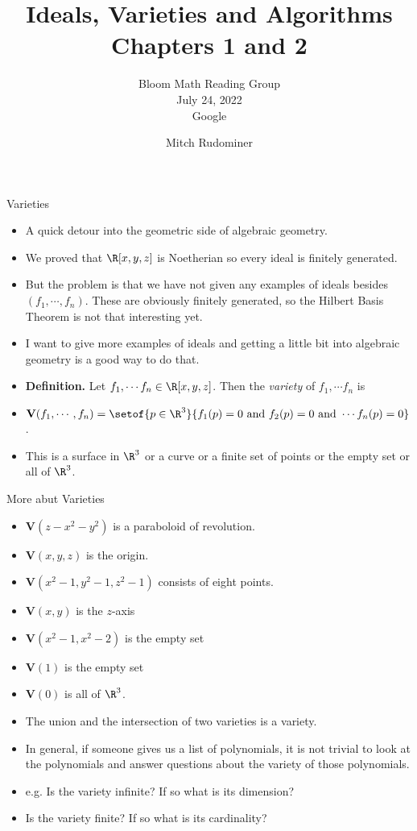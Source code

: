 \documentclass{beamer}
\title{Ideals, Varieties and Algorithms \\ Chapters 1 and 2}
\subtitle{Bloom Math Reading Group \\ July 24, 2022 \\ Google}
\author{Mitch Rudominer}
\date{}
\begin{document}
\begin{frame}
  \titlepage
\end{frame}


\begin{frame}{Varieties}

\begin{itemize}
  \item A quick detour into the geometric side of algebraic geometry.
  \item We proved that $\R[x,y,z]$ is Noetherian so every ideal is finitely generated.
  \item But the problem is that we have not given any examples of ideals besides $(f_1,\cdots, f_n)$. These are obviously finitely generated,
  so the Hilbert Basis Theorem is not that interesting yet.
  \item I want to give more examples of ideals and getting a little bit into algebraic geometry is a good way to do that.
  \item \textbf{Definition.} Let $f_1,\cdots f_n \in \R[x,y,z]$. Then the \emph{variety} of $f_1,\cdots f_n$ is
  \item $\mathbf{V}(f_1,\cdots,f_n) = \setof{p\in\R^3}{f_1(p)=0 \text{ and } f_2(p)=0 \text{ and } \cdots f_n(p)=0}$.
  \item This is a surface in $\R^3$ or a curve or a finite set of points or the empty set or all of $\R^3$.
\end{itemize}
\end{frame}



\begin{frame}{More abut Varieties}

\begin{itemize}
  \item $\mathbf{V}(z-x^2-y^2)$ is a paraboloid of revolution.
  \item $\mathbf{V}(x,y,z)$ is the origin.
  \item $\mathbf{V}(x^2-1,y^2-1,z^2-1)$ consists of eight points.
  \item $\mathbf{V}(x,y)$ is the $z$-axis
  \item $\mathbf{V}(x^2 - 1,x^2 - 2)$ is the empty set
  \item $\mathbf{V}(1)$ is the empty set
  \item $\mathbf{V}(0)$ is all of $\R^3$.
  \item The union and the intersection of two varieties is a variety.
  \item In general, if someone gives us a list of polynomials, it is not trivial to look at the polynomials and
  answer questions about the variety of those polynomials.
  \item e.g. Is the variety infinite? If so what is its dimension?
  \item Is the variety finite? If so what is its cardinality?

\end{itemize}
\end{frame}
\end{document}
